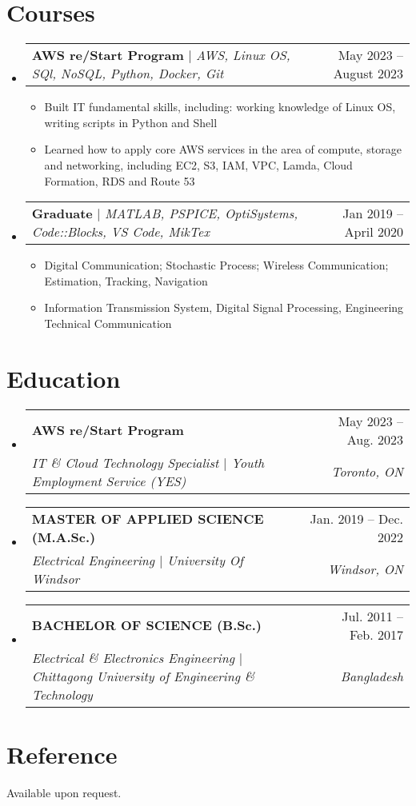 \documentclass[letterpaper,11pt]{article}
\makeatletter
\newcommand{\resumeItem}[1]{
  \item\small{
    {#1 \vspace{-2pt}}
  }
}
\newcommand{\resumeSubheading}[4]{
  \vspace{-2pt}\item
    \begin{tabular*}{0.97\textwidth}[t]{l@{\extracolsep{\fill}}r}
      \textbf{#1} & #2 \\
      \textit{\small#3} & \textit{\small #4} \\
    \end{tabular*}\vspace{-7pt}
}
\newcommand{\resumeProjectHeading}[2]{
    \item
    \begin{tabular*}{0.97\textwidth}{l@{\extracolsep{\fill}}r}
      \small#1 & #2 \\
    \end{tabular*}\vspace{-7pt}
}
\newcommand{\resumeSubHeadingListStart}{\begin{itemize}[leftmargin=0.15in, label={}]}
\newcommand{\resumeSubHeadingListEnd}{\end{itemize}}
\newcommand{\resumeItemListStart}{\begin{itemize}}
\newcommand{\resumeItemListEnd}{\end{itemize}\vspace{-5pt}}
\makeatother
\begin{document}
\section{Courses}
    \resumeSubHeadingListStart
      \resumeProjectHeading
          {\textbf{AWS re/Start Program} $|$ \emph{AWS, Linux OS,  SQl, NoSQL, Python, Docker, Git}}{May 2023 -- August 2023}
          \resumeItemListStart
            \resumeItem{Built IT fundamental skills, including: working knowledge of Linux OS, writing scripts in
            Python and Shell}
            \resumeItem{Learned how to apply core AWS services in the area of compute, storage and
            networking, including EC2, S3, IAM, VPC, Lamda, Cloud Formation, RDS and Route 53}
          \resumeItemListEnd
          \resumeProjectHeading
          {\textbf{Graduate} $|$ \emph{MATLAB, PSPICE, OptiSystems, Code::Blocks, VS Code, MikTex}}{Jan 2019 -- April 2020}
          \resumeItemListStart
            \resumeItem{Digital Communication; Stochastic Process; Wireless Communication; Estimation, Tracking, Navigation }
            \resumeItem{Information Transmission System, Digital Signal Processing, Engineering Technical Communication}
          \resumeItemListEnd
    \resumeSubHeadingListEnd
%

\section{Education}
  \resumeSubHeadingListStart
    \resumeSubheading
    {AWS re/Start Program}{May 2023 -- Aug. 2023}
    {IT \texorpdfstring{\&}{and} Cloud Technology Specialist $|$ Youth Employment Service (YES)}{Toronto, ON}
    \resumeSubheading
      {MASTER OF APPLIED SCIENCE (M.A.Sc.) }{Jan. 2019 -- Dec. 2022}
      {Electrical Engineering $|$ University Of Windsor }{Windsor, ON}
    \resumeSubheading
      {BACHELOR OF SCIENCE (B.Sc.) }{Jul. 2011 -- Feb. 2017 } 
      {Electrical \texorpdfstring{\&}{and} Electronics Engineering $|$ Chittagong University of Engineering \texorpdfstring{\&}{and} Technology }{Bangladesh}
  \resumeSubHeadingListEnd


  \section{Reference}
      \hspace{0.5cm}Available upon request.


\end{document}
